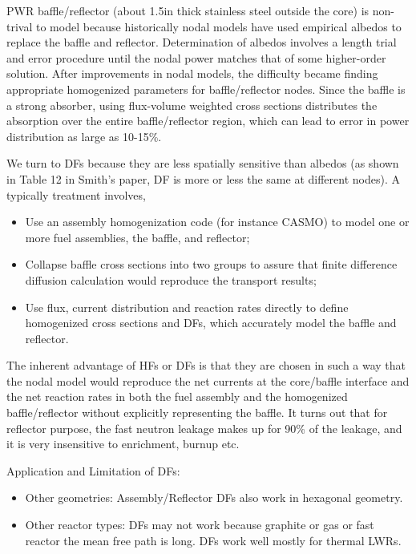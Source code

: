 \documentclass{school-22.211-notes}
\begin{document}
\clearpage
{}
PWR baffle/reflector (about 1.5in thick stainless steel outside the core) is non-trival to model because historically nodal models have used empirical albedos to replace the baffle and reflector. Determination of albedos involves a length trial and error procedure until the nodal power matches that of some higher-order solution. After improvements in nodal models, the difficulty became finding appropriate homogenized parameters for baffle/reflector nodes. Since the baffle is a strong absorber, using flux-volume weighted cross sections distributes the absorption over the entire baffle/reflector region, which can lead to error in power distribution as large as 10-15\%. 

We turn to DFs because they are less spatially sensitive than albedos (as shown in Table 12 in Smith's paper, DF is more or less the same at different nodes). A typically treatment involves, 
\begin{itemize}
\item Use an assembly homogenization code (for instance CASMO) to model one or more fuel assemblies, the baffle, and reflector; 
\item Collapse baffle cross sections into two groups to assure that finite difference diffusion calculation would reproduce the transport results;  
\item Use flux, current distribution and reaction rates directly to define homogenized cross sections and DFs, which accurately model the baffle and reflector. 
\end{itemize}
The inherent advantage of HFs or DFs is that they are chosen in such a way that the nodal model would reproduce the net currents at the core/baffle interface and the net reaction rates in both the fuel assembly and the homogenized baffle/reflector without explicitly representing the baffle. It turns out that for reflector purpose, the fast neutron leakage makes up for 90\% of the leakage, and it is very insensitive to enrichment, burnup etc. 

Application and Limitation of DFs:
\begin{itemize}
\item Other geometries: Assembly/Reflector DFs also work in hexagonal geometry. 
\item Other reactor types: DFs may not work because graphite or gas or fast reactor the mean free path is long. DFs work well mostly for thermal LWRs. 
\end{itemize}
\end{document}

